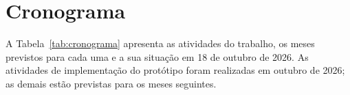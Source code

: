 \documentclass[
    12pt,                   %
    openright,              %
    oneside,                %
    a4paper,                %
    sumario=tradicional,    %
    english,                %
    brazil,                 %
    ]{abntex2}
\begin{document}




\chapter{Cronograma}\label{sec:cronograma}

A Tabela~\ref{tab:cronograma} apresenta as atividades do trabalho, os meses previstos para cada uma e a sua situação em 18 de outubro de 2026. As atividades de implementação do protótipo foram realizadas em outubro de 2026; as demais estão previstas para os meses seguintes.
\end{document}
